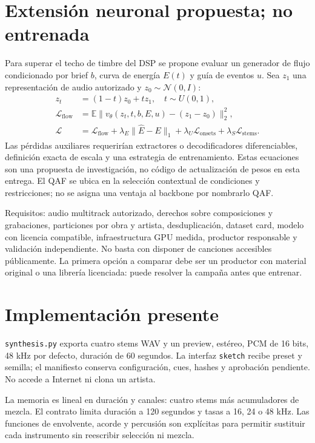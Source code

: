 \documentclass[11pt,a4paper]{article}
\begin{document}
\newpage
\section{Extensión neuronal propuesta; no entrenada}
Para superar el techo de timbre del DSP se propone evaluar un generador de flujo condicionado por brief $b$, curva de energía $E(t)$ y guía de eventos $u$. Sea $z_1$ una representación de audio autorizado y $z_0\sim\mathcal N(0,I)$:
\begin{align}
 z_t&=(1-t)z_0+tz_1,\quad t\sim U(0,1),\\
 \mathcal L_{\mathrm{flow}}&=\mathbb E\|v_\theta(z_t,t,b,E,u)-(z_1-z_0)\|_2^2,\\
 \mathcal L&=\mathcal L_{\mathrm{flow}}+\lambda_E\|\hat E-E\|_1+
 \lambda_U\mathcal L_{\mathrm{onsets}}+\lambda_S\mathcal L_{\mathrm{stems}}.
\end{align}
Las pérdidas auxiliares requerirían extractores o decodificadores diferenciables, definición exacta de escala y una estrategia de entrenamiento. Estas ecuaciones son una propuesta de investigación, no código de actualización de pesos en esta entrega. El QAF se ubica en la selección contextual de condiciones y restricciones; no se asigna una ventaja al backbone por nombrarlo QAF.

Requisitos: audio multitrack autorizado, derechos sobre composiciones y grabaciones, particiones por obra y artista, desduplicación, dataset card, modelo con licencia compatible, infraestructura GPU medida, productor responsable y validación independiente. No basta con disponer de canciones accesibles públicamente. La primera opción a comparar debe ser un productor con material original o una librería licenciada: puede resolver la campaña antes que entrenar.
\section{Implementación presente}
\texttt{synthesis.py} exporta cuatro stems WAV y un preview, estéreo, PCM de 16 bits, 48 kHz por defecto, duración de 60 segundos. La interfaz \texttt{sketch} recibe preset y semilla; el manifiesto conserva configuración, cues, hashes y aprobación pendiente. No accede a Internet ni clona un artista.

La memoria es lineal en duración y canales: cuatro stems más acumuladores de mezcla. El contrato limita duración a 120 segundos y tasas a 16, 24 o 48 kHz. Las funciones de envolvente, acorde y percusión son explícitas para permitir sustituir cada instrumento sin reescribir selección ni mezcla.
\end{document}
